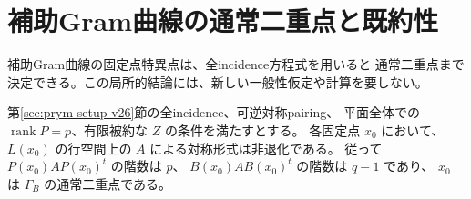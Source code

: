 \section{補助Gram曲線の通常二重点と既約性}
\label{sec:complementary-nodes-v26}
\label{subsec:complementary-gram-nodes-v26}

補助Gram曲線の固定点特異点は、全incidence方程式を用いると
通常二重点まで決定できる。この局所的結論には、新しい一般性仮定や計算を要しない。

\begin{proposition}[固定点における非退化な法線形式]
\label{prop:fixed-gram-node-v26}
第\ref{sec:prym-setup-v26}節の全incidence、可逆対称pairing、
平面全体での $\operatorname{rank}P=p$、有限被約な $Z$ の条件を満たすとする。
各固定点 $x_0$ において、$L(x_0)$ の行空間上の $A$ による対称形式は非退化である。
従って $P(x_0)AP(x_0)^t$ の階数は $p$、
$B(x_0)AB(x_0)^t$ の階数は $q-1$ であり、
$x_0$ は $\Gamma_B$ の通常二重点である。
\end{proposition}


